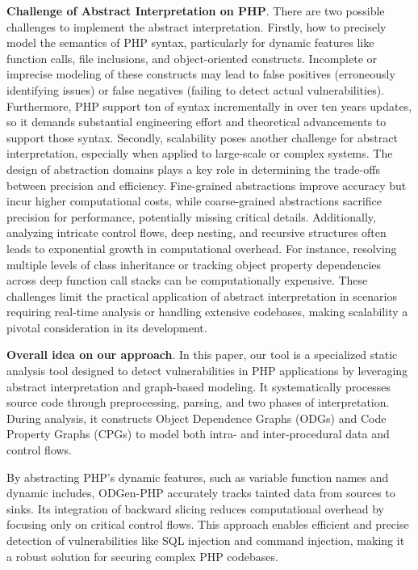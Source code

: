 \textbf{Challenge of Abstract Interpretation on PHP}. There are two possible challenges to implement the abstract interpretation. Firstly, how to precisely model the semantics of PHP syntax, particularly for dynamic features like function calls, file inclusions, and object-oriented constructs. Incomplete or imprecise modeling of these constructs may lead to false positives (erroneously identifying issues) or false negatives (failing to detect actual vulnerabilities). Furthermore, PHP support ton of syntax incrementally in over ten years updates, so it demands substantial engineering effort and theoretical advancements to support those syntax.
Secondly, scalability poses another challenge for abstract interpretation, especially when applied to large-scale or complex systems. The design of abstraction domains plays a key role in determining the trade-offs between precision and efficiency. Fine-grained abstractions improve accuracy but incur higher computational costs, while coarse-grained abstractions sacrifice precision for performance, potentially missing critical details. Additionally, analyzing intricate control flows, deep nesting, and recursive structures often leads to exponential growth in computational overhead. For instance, resolving multiple levels of class inheritance or tracking object property dependencies across deep function call stacks can be computationally expensive. These challenges limit the practical application of abstract interpretation in scenarios requiring real-time analysis or handling extensive codebases, making scalability a pivotal consideration in its development.


\textbf{Overall idea on our approach}. In this paper, our tool is a specialized static analysis tool designed to detect vulnerabilities in PHP applications by leveraging abstract interpretation and graph-based modeling. It systematically processes source code through preprocessing, parsing, and two phases of interpretation. During analysis, it constructs Object Dependence Graphs (ODGs) and Code Property Graphs (CPGs) to model both intra- and inter-procedural data and control flows. 

By abstracting PHP’s dynamic features, such as variable function names and dynamic includes, ODGen-PHP accurately tracks tainted data from sources to sinks. Its integration of backward slicing reduces computational overhead by focusing only on critical control flows. This approach enables efficient and precise detection of vulnerabilities like SQL injection and command injection, making it a robust solution for securing complex PHP codebases.